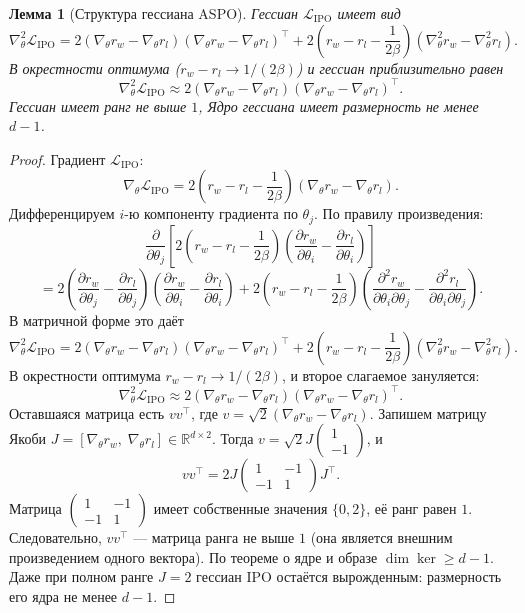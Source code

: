 \documentclass[a4paper,12pt]{article}
\newtheorem{lemma}{Лемма}
\begin{document}
\begin{lemma}[Структура гессиана ASPO]
\label{lem:hessian_ipo}
Гессиан $\mathcal{L}_{\text{IPO}}$ имеет вид
\begin{equation}
\nabla_\theta^2 \mathcal{L}_{\text{IPO}} = 2(\nabla_\theta r_w - \nabla_\theta r_l)(\nabla_\theta r_w - \nabla_\theta r_l)^\top + 2\left(r_w - r_l - \frac{1}{2\beta}\right)(\nabla_\theta^2 r_w - \nabla_\theta^2 r_l).
\end{equation}
В окрестности оптимума ($r_w - r_l \to 1/(2\beta)$) и гессиан приблизительно  равен
\[
\nabla_\theta^2 \mathcal{L}_{\text{IPO}} \approx 2(\nabla_\theta r_w - \nabla_\theta r_l)(\nabla_\theta r_w - \nabla_\theta r_l)^\top.
\]
Гессиан имеет ранг не выше $1$, Ядро гессиана имеет размерность не менее $d-1$.
\end{lemma}

\begin{proof}
Градиент $\mathcal{L}_{\text{IPO}}$:
\[
\nabla_\theta \mathcal{L}_{\text{IPO}} = 2\left(r_w - r_l - \frac{1}{2\beta}\right)(\nabla_\theta r_w - \nabla_\theta r_l).
\]
Дифференцируем $i$-ю компоненту градиента по $\theta_j$. По правилу произведения:
\[
\frac{\partial}{\partial \theta_j} \left[ 2\left(r_w - r_l - \frac{1}{2\beta}\right) \left( \frac{\partial r_w}{\partial \theta_i} - \frac{\partial r_l}{\partial \theta_i} \right) \right]
\]
\[
= 2 \left( \frac{\partial r_w}{\partial \theta_j} - \frac{\partial r_l}{\partial \theta_j} \right) \left( \frac{\partial r_w}{\partial \theta_i} - \frac{\partial r_l}{\partial \theta_i} \right)
+ 2\left(r_w - r_l - \frac{1}{2\beta}\right) \left( \frac{\partial^2 r_w}{\partial \theta_i \partial \theta_j} - \frac{\partial^2 r_l}{\partial \theta_i \partial \theta_j} \right).
\]
В матричной форме это даёт 
\[
\nabla_\theta^2 \mathcal{L}_{\text{IPO}} = 2(\nabla_\theta r_w - \nabla_\theta r_l)(\nabla_\theta r_w - \nabla_\theta r_l)^\top + 2\left(r_w - r_l - \frac{1}{2\beta}\right)(\nabla_\theta^2 r_w - \nabla_\theta^2 r_l).
\]
В окрестности оптимума $r_w - r_l \to 1/(2\beta)$, и второе слагаемое зануляется:
\[
\nabla_\theta^2 \mathcal{L}_{\text{IPO}} \approx 2(\nabla_\theta r_w - \nabla_\theta r_l)(\nabla_\theta r_w - \nabla_\theta r_l)^\top.
\]
Оставшаяся матрица есть $v v^\top$, где $v = \sqrt{2}(\nabla_\theta r_w - \nabla_\theta r_l)$. 
Запишем матрицу Якоби $J = [\nabla_\theta r_w,\; \nabla_\theta r_l] \in \mathbb{R}^{d \times 2}$. Тогда $v = \sqrt{2}J \begin{pmatrix} 1 \\ -1 \end{pmatrix}$, и
\[
v v^\top = 2 J \begin{pmatrix} 1 & -1 \\ -1 & 1 \end{pmatrix} J^\top.
\]
Матрица $\begin{pmatrix} 1 & -1 \\ -1 & 1 \end{pmatrix}$ имеет собственные значения $\{0, 2\}$, её ранг равен $1$. Следовательно, $v v^\top$ — матрица ранга не выше $1$ (она является внешним произведением одного вектора). По теореме о ядре и образе $\dim \ker \ge d - 1$. Даже при полном ранге $J = 2$ гессиан IPO остаётся вырожденным: размерность его ядра не менее $d-1$.
\end{proof}
\end{document}
